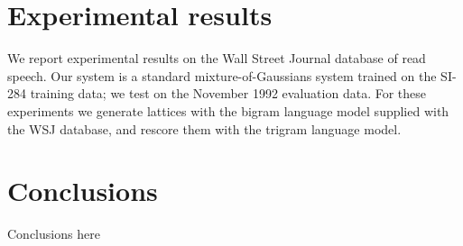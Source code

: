 \documentclass{article}
\begin{document}
\section{Experimental results}
\label{sec:exp}

We report experimental results on the Wall Street Journal database of
read speech.  
Our system is a standard mixture-of-Gaussians system trained on the SI-284
training data; we test on the November 1992 evaluation data.  
For these experiments we generate lattices with the bigram language model
supplied with the WSJ database, and rescore them with the trigram language model.









\section{Conclusions}
\label{sec:conc}

Conclusions here



\end{document}
